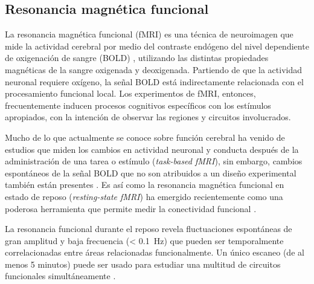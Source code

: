 \subsection{Resonancia magnética funcional}
La resonancia magnética funcional (fMRI) es una técnica de neuroimagen que mide la actividad cerebral por medio del contraste endógeno del nivel dependiente de oxigenación de sangre (BOLD) \parencite{Ogawa1993}, utilizando las distintas propiedades magnéticas de la sangre oxigenada y deoxigenada.
Partiendo de que la actividad neuronal requiere oxígeno, la señal BOLD está indirectamente relacionada con el procesamiento funcional local.
Los experimentos de fMRI, entonces, frecuentemente inducen procesos cognitivos específicos con los estímulos apropiados, con la intención de observar las regiones y circuitos involucrados. \par
Mucho de lo que actualmente se conoce sobre función cerebral ha venido de estudios que miden los cambios en actividad neuronal y conducta después de la administración de una tarea o estímulo (\textit{task-based fMRI}), sin embargo, cambios espontáneos de la señal BOLD que no son atribuidos a un diseño experimental también están presentes \parencite{Fox2007}.
Es así como la resonancia magnética funcional en estado de reposo (\textit{resting-state fMRI}) ha emergido recientemente como una poderosa herramienta que permite medir la conectividad funcional \parencite{Biswal2010}.\par
La resonancia funcional durante el reposo revela fluctuaciones espontáneas de gran amplitud y baja frecuencia (\deactivatequoting\SI{< 0.1}{\hertz}\activatequoting) que pueden ser temporalmente correlacionadas entre áreas relacionadas funcionalmente.
Un único escaneo (de al menos 5 minutos) puede ser usado para estudiar una multitud de circuitos funcionales simultáneamente \parencite{Biswal2010}.

